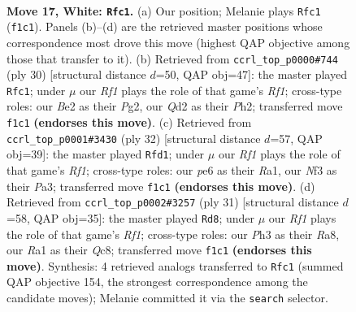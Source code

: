 \documentclass[11pt]{article}
\begin{document}
\clearpage

\begin{figure}[p]\centering
\begin{subfigure}{0.46\textwidth}\centering
\resizebox{\linewidth}{!}{%
\newchessgame
\chessboard[
  setfen={r1b1r1k1/1p2qppp/2n1p3/p1Pp4/3P4/P1P2N1P/3QBPP1/R4RK1 w - - 0 17},
  showmover=false,
  pgfstyle=straightmove, color=movearrow, markmove={f1-c1}
]}
\caption{}
\end{subfigure}\hfill
\begin{subfigure}{0.46\textwidth}\centering
\resizebox{\linewidth}{!}{%
\newchessgame
\chessboard[
  setfen={r1r3k1/1pq1bppp/p2ppn2/P7/Q3P3/3PBN2/1P3PPP/R4RK1 w - - 1 16},
  showmover=false,
  pgfstyle=straightmove, color=movearrow, markmove={f1-c1}
]}
\caption{}
\end{subfigure}
\\[4pt]
\begin{subfigure}{0.46\textwidth}\centering
\resizebox{\linewidth}{!}{%
\newchessgame
\chessboard[
  setfen={r1b2rk1/1pq2ppp/3pn3/p3p3/2P1P3/PP2QN1P/4BPP1/R4RK1 w - - 3 17},
  showmover=false,
  pgfstyle=straightmove, color=movearrow, markmove={f1-d1}
]}
\caption{}
\end{subfigure}\hfill
\begin{subfigure}{0.46\textwidth}\centering
\resizebox{\linewidth}{!}{%
\newchessgame
\chessboard[
  setfen={r1q2rk1/p1p1bpp1/1p2pn1p/8/P2P4/1QBN2P1/1P2PPKP/R4R2 b - - 0 16},
  showmover=false,
  pgfstyle=straightmove, color=movearrow, markmove={f8-d8}
]}
\caption{}
\end{subfigure}
\caption{\textbf{Move 17, White: \texttt{Rfc1}.} (a) Our position; Melanie plays \texttt{Rfc1} (\texttt{f1c1}). Panels (b)--(d) are the retrieved master positions whose correspondence most drove this move (highest QAP objective among those that transfer to it). (b) Retrieved from \texttt{ccrl\_top\_p0000\#744} (ply 30) [structural distance $d$=50, QAP obj=47]: the master played \texttt{Rfc1}; under $\mu$ our \emph{Rf1} plays the role of that game's \emph{Rf1}; cross-type roles: our \emph{B}e2 as their \emph{P}g2, our \emph{Q}d2 as their \emph{P}h2; transferred move \texttt{f1c1} \textbf{(endorses this move)}. (c) Retrieved from \texttt{ccrl\_top\_p0001\#3430} (ply 32) [structural distance $d$=57, QAP obj=39]: the master played \texttt{Rfd1}; under $\mu$ our \emph{Rf1} plays the role of that game's \emph{Rf1}; cross-type roles: our \emph{p}e6 as their \emph{R}a1, our \emph{N}f3 as their \emph{P}a3; transferred move \texttt{f1c1} \textbf{(endorses this move)}. (d) Retrieved from \texttt{ccrl\_top\_p0002\#3257} (ply 31) [structural distance $d$=58, QAP obj=35]: the master played \texttt{Rd8}; under $\mu$ our \emph{Rf1} plays the role of that game's \emph{Rf1}; cross-type roles: our \emph{P}h3 as their \emph{R}a8, our \emph{R}a1 as their \emph{Q}c8; transferred move \texttt{f1c1} \textbf{(endorses this move)}. Synthesis: 4 retrieved analogs transferred to \texttt{Rfc1} (summed QAP objective 154, the strongest correspondence among the candidate moves); Melanie committed it via the \texttt{search} selector.}
\label{fig:thought-m32}
\end{figure}
\end{document}
